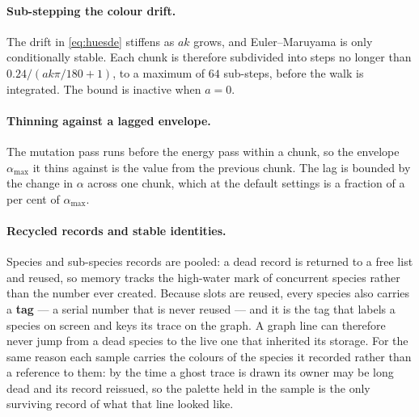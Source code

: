 \documentclass[11pt,a4paper]{article}
\begin{document}
\paragraph{Sub-stepping the colour drift.} The drift in \eqref{eq:huesde} stiffens as
$ak$ grows, and Euler--Maruyama is only conditionally stable. Each chunk is therefore
subdivided into steps no longer than $0.24/(a k \pi/180 + 1)$, to a maximum of $64$
sub-steps, before the walk is integrated. The bound is inactive when $a = 0$.

\paragraph{Thinning against a lagged envelope.} The mutation pass runs before the energy
pass within a chunk, so the envelope $\alpha_{\max}$ it thins against is the value from
the previous chunk. The lag is bounded by the change in $\alpha$ across one chunk,
which at the default settings is a fraction of a per cent of $\alpha_{\max}$.

\paragraph{Recycled records and stable identities.} Species and sub-species records are
pooled: a dead record is returned to a free list and reused, so memory tracks the
high-water mark of concurrent species rather than the number ever created. Because slots
are reused, every species also carries a \textbf{tag} --- a serial number that is never
reused --- and it is the tag that labels a species on screen and keys its trace on the
graph. A graph line can therefore never jump from a dead species to the live one that
inherited its storage. For the same reason each sample carries the colours of the species it
recorded rather than a reference to them: by the time a ghost trace is drawn its owner may be
long dead and its record reissued, so the palette held in the sample is the only surviving
record of what that line looked like.
\end{document}
